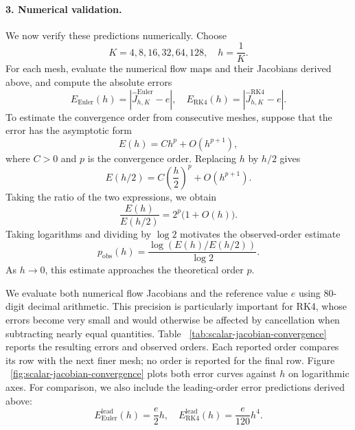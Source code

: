 \documentclass[12pt,a4paper,oneside]{book}
\begin{document}
\begin{solution}
\paragraph{3. Numerical validation.}

We now verify these predictions numerically. Choose
\begin{equation*}
    K=4,8,16,32,64,128, \quad h=\frac{1}{K}.
\end{equation*}
For each mesh, evaluate the numerical flow maps and their Jacobians derived above, and compute the absolute errors
\begin{equation*}
    E_{\mathrm{Euler}}(h) = \left|\widehat J_{h,K}^{\mathrm{Euler}}-e\right|,\quad
    E_{\mathrm{RK4}}(h) =\left|\widehat J_{h,K}^{\mathrm{RK4}}-e\right|.
\end{equation*}
To estimate the convergence order from consecutive meshes, suppose that the error has the asymptotic form
\begin{equation*}
    E(h)=Ch^p+O(h^{p+1}),
\end{equation*}
where $C>0$ and $p$ is the convergence order. Replacing $h$ by $h/2$ gives
\begin{equation*}
    E(h/2) = C\left(\frac h2\right)^p+O(h^{p+1}).
\end{equation*}
Taking the ratio of the two expressions, we obtain
\begin{equation*}
    \frac{E(h)}{E(h/2)} = 2^p\bigl(1+O(h)\bigr).
\end{equation*}
Taking logarithms and dividing by $\log 2$ motivates the observed-order estimate
\begin{equation}
    p_{\mathrm{obs}}(h) = \frac{\log(E(h)/E(h/2))}{\log 2}.
    \label{eq:scalar-jacobian-order}
\end{equation}
As $h\to0$, this estimate approaches the theoretical order $p$.

We evaluate both numerical flow Jacobians and the reference value $e$ using 80-digit decimal arithmetic. This precision is
particularly important for RK4, whose errors become very small and would otherwise be affected by cancellation when subtracting
nearly equal quantities. Table ~\ref{tab:scalar-jacobian-convergence} reports the resulting errors and observed orders.
Each reported order compares its row with the next finer mesh; no order is reported for the final row. Figure ~\ref{fig:scalar-jacobian-convergence}
plots both error curves against $h$ on logarithmic axes. For comparison, we also include the leading-order error predictions
derived above:
\begin{equation*}
    E_{\mathrm{Euler}}^{\mathrm{lead}}(h) = \frac e2h, \quad
    E_{\mathrm{RK4}}^{\mathrm{lead}}(h) = \frac e{120}h^4.
\end{equation*}


\end{solution}
\end{document}
